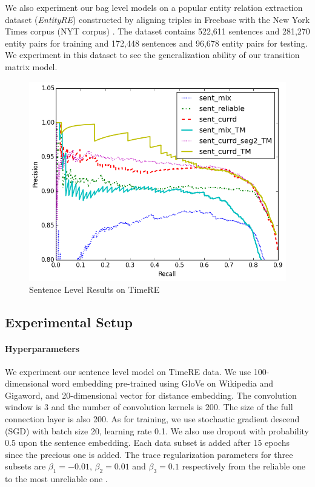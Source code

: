 We also experiment our bag level models on a popular entity relation extraction dataset (\emph{EntityRE}) constructed by aligning triples in Freebase with the New York Times corpus (NYT corpus) \cite{riedel2010modeling}. The dataset contains 522,611 sentences and 281,270 entity pairs for training and  172,448 sentences and 96,678 entity pairs for testing. We experiment  in this dataset to see the generalization ability of our transition matrix model.

\begin{figure}[htbp]
\begin{center}
\includegraphics[width=0.9\linewidth]{figures/sent_time_exp_overall.png}
\caption{Sentence Level Results on TimeRE}
\label{fig: sent_luo}
\end{center}
\end{figure}

\subsection{Experimental Setup}

\paragraph{Hyperparameters} 
We experiment our sentence level model on TimeRE data. We use 100-dimensional word embedding pre-trained using GloVe \cite{pennington2014glove} on Wikipedia and Gigaword, and 20-dimensional vector for distance embedding. The convolution window is 3 and the number of convolution kernels is 200. The size of the full connection layer is also 200. As for training, we use stochastic gradient descend (SGD) with batch size 20, learning rate 0.1. We also use dropout with probability 0.5 upon the sentence embedding. Each data subset is added after 15 epochs since the precious one is added. The trace regularization parameters for three subsets are $\beta_1=-0.01$, $\beta_2=0.01$ and $\beta_3=0.1$ respectively from the reliable one to the most unreliable one .


